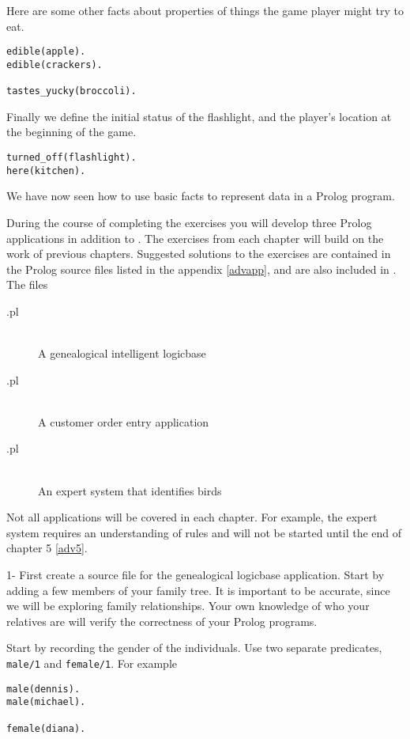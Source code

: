 Here are some other facts about properties of things the game player might try
to eat.
\begin{verbatim}
edible(apple).
edible(crackers).

tastes_yucky(broccoli).
\end{verbatim}

Finally we define the initial status of the flashlight, and the player's
location at the beginning of the game.
\begin{verbatim}
turned_off(flashlight).
here(kitchen).
\end{verbatim}
We have now seen how to use basic facts to represent data in a Prolog program.


During the course of completing the exercises you will develop three Prolog
applications in addition to . The exercises from each chapter
will build on the work of previous chapters. Suggested solutions to the
exercises are contained in the Prolog source files listed in the appendix
\ref{advapp}, and are also included in .
The files
\begin{description}
\item[.pl]\ \\A genealogical intelligent logicbase
\item[.pl]\ \\A customer order entry application
\item[.pl]\ \\An expert system that identifies birds
\end{description}

Not all applications will be covered in each chapter. For example, the expert
system requires an understanding of rules and will not be started until the end
of chapter 5 \ref{adv5}.


1- First create a source file  for the genealogical logicbase
application. Start by adding a few members of your family tree. It is important
to be accurate, since we will be exploring family relationships. Your own
knowledge of who your relatives are will verify the correctness of your Prolog
programs.

Start by recording the gender of the individuals. Use two separate predicates,
\verb'male/1' and \verb'female/1'. For example
\begin{verbatim}
male(dennis).
male(michael).

female(diana).
\end{verbatim}

